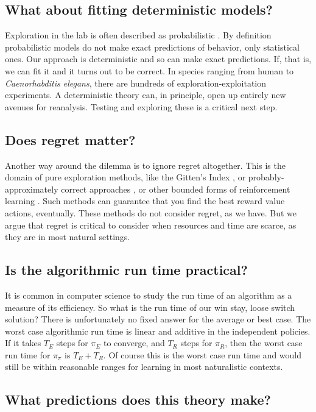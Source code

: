 \subsection*{What about fitting deterministic models?}
Exploration in the lab is often described as probabilistic \cite{Calhoun2014,Song2019a,Gershman2018b,Schulz2018a}. By definition probabilistic models do not make exact predictions of behavior, only statistical ones. Our approach is deterministic and so can make exact predictions. If, that is, we can fit it and it turns out to be correct. In species ranging from human to \textit{Caenorhabditis elegans}, there are hundreds of exploration-exploitation experiments. A deterministic theory can, in principle, open up entirely new avenues for reanalysis. Testing and exploring these is a critical next step.


\subsection*{Does regret matter?}
Another way around the dilemma is to ignore regret altogether. This is the domain of pure exploration methods, like the Gitten’s Index \cite{Gittins1979}, or probably-approximately correct approaches \cite{Valiant1984}, or other bounded forms of reinforcement learning \cite{Brafman2002}. Such methods can guarantee that you find the best reward value actions, eventually. These methods do not consider regret, as we have. But we argue that regret is critical to consider when resources and time are scarce, as they are in most natural settings. 


\subsection*{Is the algorithmic run time practical?}
It is common in computer science to study the run time of an algorithm as a measure of its efficiency. So what is the run time of our win stay, loose switch solution? There is unfortunately no fixed answer for the average or best case. The worst case algorithmic run time is linear and additive in the independent policies. If it takes $T_E$ steps for $\pi_E$ to converge, and $T_R$ steps for $\pi_R$, then the worst case run time for $\pi_{\pi}$ is $T_E + T_R$. Of course this is the worst case run time and would still be within reasonable ranges for learning in most naturalistic contexts.

\subsection*{What predictions does this theory make?}
% 

